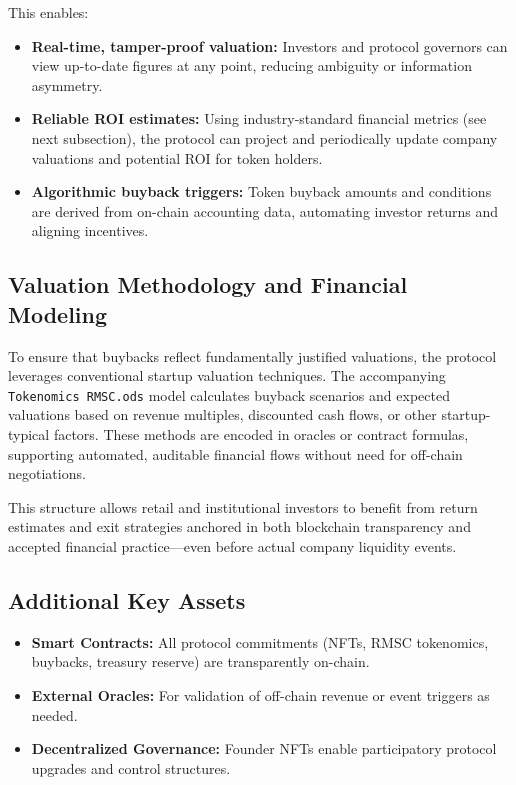 \documentclass[conference]{IEEEtran}
\begin{document}
This enables:
\begin{itemize}
    \item \textbf{Real-time, tamper-proof valuation:} Investors and protocol governors can view up-to-date figures at any point, reducing ambiguity or information asymmetry.
    \item \textbf{Reliable ROI estimates:} Using industry-standard financial metrics (see next subsection), the protocol can project and periodically update company valuations and potential ROI for token holders.
    \item \textbf{Algorithmic buyback triggers:} Token buyback amounts and conditions are derived from on-chain accounting data, automating investor returns and aligning incentives.
\end{itemize}

\subsection{Valuation Methodology and Financial Modeling}
To ensure that buybacks reflect fundamentally justified valuations, the protocol leverages conventional startup valuation techniques. The accompanying \texttt{Tokenomics RMSC.ods} model calculates buyback scenarios and expected valuations based on revenue multiples, discounted cash flows, or other startup-typical factors. These methods are encoded in oracles or contract formulas, supporting automated, auditable financial flows without need for off-chain negotiations.

This structure allows retail and institutional investors to benefit from return estimates and exit strategies anchored in both blockchain transparency and accepted financial practice—even before actual company liquidity events.

\subsection{Additional Key Assets}
\begin{itemize}
    \item \textbf{Smart Contracts:} All protocol commitments (NFTs, RMSC tokenomics, buybacks, treasury reserve) are transparently on-chain.
    \item \textbf{External Oracles:} For validation of off-chain revenue or event triggers as needed.
    \item \textbf{Decentralized Governance:} Founder NFTs enable participatory protocol upgrades and control structures.
\end{itemize}
\end{document}
